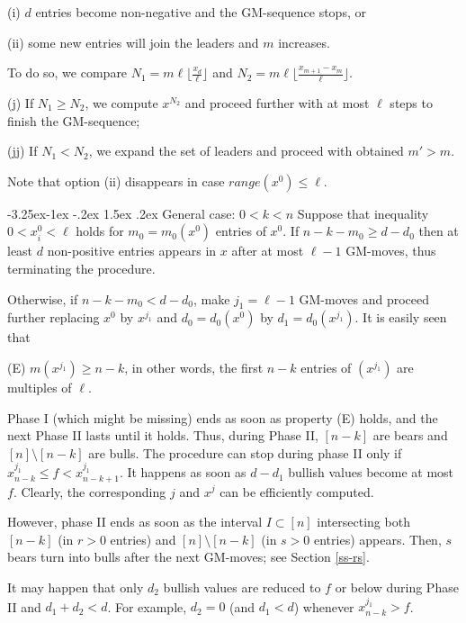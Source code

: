 \documentclass[10pt]{article}
\makeatletter
\renewcommand\subsection{\@startsection{subsection}{2}{\z@}
{-3.25ex\@plus -1ex \@minus -.2ex}
{1.5ex \@plus .2ex}
{\normalfont\normalsize\bfseries\boldmath}}
\theoremstyle{definition}
\makeatother
\begin{document}
(i) $d$  entries become non-negative 
and the GM-sequence stops, or 

(ii) some new entries will join the leaders and $m$ increases. 

To do so, we compare 
$N_1 = m \ell \lfloor \frac{x_d}{\ell} \rfloor$ and 
$N_2 = m \ell \lfloor \frac{x_{m+1} - x_m}{\ell} \rfloor$. 

(j) If $N_1 \geq N_2$, we compute $x^{N_2}$ 
and proceed further with at most $\ell$  steps to finish 
the GM-sequence; 

(jj)  If $N_1 < N_2$, we expand the set of leaders and 
proceed with obtained  $m' > m$. 

Note that option (ii) disappears in case $range(x^0) \leq \ell$. 

\subsection{General case: $0 < k < n$}
Suppose that inequality 
$0 < x_i^0 < \ell$  holds 
for $m_0 = m_0(x^0)$ entries of $x^0$.  
If $n-k-m_0 \geq d-d_0$  
then at least $d$ non-positive entries 
appears in $x$  after at most $\ell-1$  GM-moves, 
thus terminating the procedure. 

Otherwise, if  $n-k-m_0 < d-d_0$,  
make $j_1 = \ell-1$  GM-moves and proceed further 
replacing  $x^0$ by $x^{j_1}$  and 
$d_0 = d_0(x^0)$  by $d_1 = d_0(x^{j_1})$.    
It is easily seen that 

\smallskip 

\noindent 
(E)  
$m(x^{j_1}) \geq n-k$, in other words, 
the first $n-k$  entries of $(x^{j_1})$ 
are multiples of $\ell$. 

\smallskip 

Phase I (which might be missing) ends 
as soon as property (E) holds, 
and the next Phase II lasts until it holds. 
Thus, during Phase II, 
$[n-k]$  are bears and 
$[n] \setminus [n-k]$ are bulls. 
The procedure can stop during phase II 
only if  $x_{n-k}^{j_1} \leq f < x_{n-k+1}^{j_1}$.
It happens as soon as $d - d_1$  bullish values 
become at most $f$. 
Clearly, the corresponding  $j$  and $x^j$ 
can be efficiently computed. 

However, phase II ends as soon 
as the interval $I \subset [n]$ 
intersecting both 
$[n-k]$  (in $r > 0$ entries) and  
$[n] \setminus [n-k]$ (in $s > 0$ entries) appears. 
Then, $s$ bears turn into bulls 
after the next GM-moves; see Section \ref{ss-rs}.

It may happen that only $d_2$ bullish values 
are reduced to $f$ or below 
during Phase II and  $d_1 + d_2 < d$. 
For example, $d_2 = 0$  (and $d_1 < d$)  
whenever $x_{n-k}^{j_1} > f$. 
\end{document}
